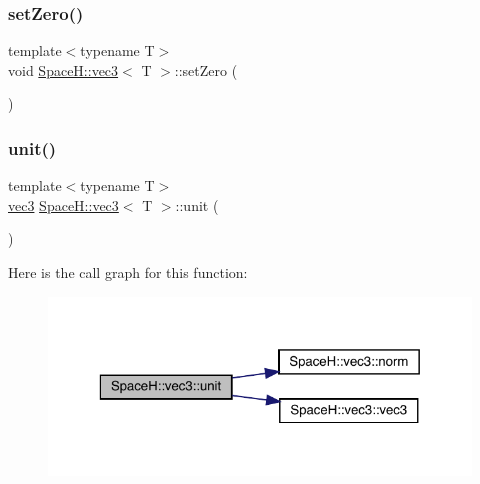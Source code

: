 \mbox{\label{struct_space_h_1_1vec3_ad2e7b91b843f84633372857718f1b5ba}} 
\subsubsection{\texorpdfstring{set\+Zero()}{setZero()}\hspace{0.1cm}{\footnotesize\ttfamily [4/4]}}
{\footnotesize\ttfamily template$<$typename T$>$ \\
void \mbox{\hyperlink{struct_space_h_1_1vec3}{Space\+H\+::vec3}}$<$ T $>$\+::set\+Zero (\begin{DoxyParamCaption}{ }\end{DoxyParamCaption})\hspace{0.3cm}{\ttfamily [inline]}}

\mbox{\label{struct_space_h_1_1vec3_a7733c9e0651122a67a0fdda34415985c}} 
\subsubsection{\texorpdfstring{unit()}{unit()}}
{\footnotesize\ttfamily template$<$typename T$>$ \\
\mbox{\hyperlink{struct_space_h_1_1vec3}{vec3}} \mbox{\hyperlink{struct_space_h_1_1vec3}{Space\+H\+::vec3}}$<$ T $>$\+::unit (\begin{DoxyParamCaption}{ }\end{DoxyParamCaption})\hspace{0.3cm}{\ttfamily [inline]}}

Here is the call graph for this function\+:
\nopagebreak
\begin{figure}[H]
\begin{center}
\leavevmode
\includegraphics[width=323pt]{struct_space_h_1_1vec3_a7733c9e0651122a67a0fdda34415985c_cgraph}
\end{center}
\end{figure}


